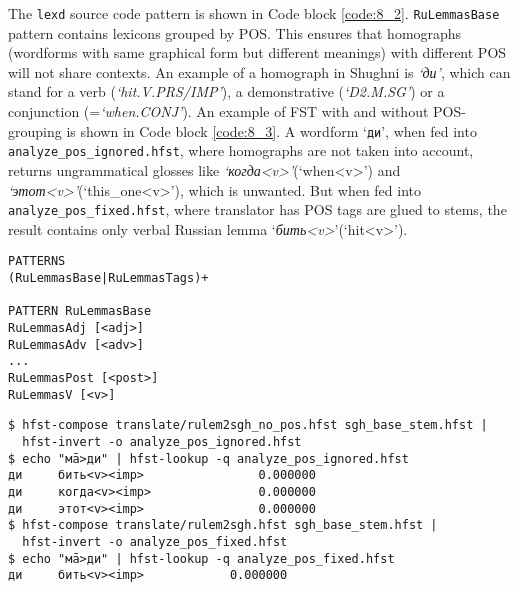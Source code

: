 The \texttt{lexd} source code pattern is shown in Code block \ref{code:8_2}. \texttt{RuLemmasBase} pattern contains lexicons grouped by POS. This ensures that homographs (wordforms with same graphical form but different meanings) with different POS will not share contexts. An example of a homograph in Shughni is \textit{`ди'}, which can stand for a verb (\textit{`hit.V.PRS/IMP'}), a demonstrative (\textit{`D2.M.SG'}) or a conjunction (=\textit{`when.CONJ'}). An example of FST with and without POS-grouping is shown in Code block \ref{code:8_3}. A wordform `\texttt{ди}', when fed into \texttt{analyze\_pos\_ignored.hfst}, where homographs are not taken into account, returns ungrammatical glosses like \textit{`когда<v>'}(`when<v>') and \textit{`этот<v>'}(`this\_one<v>'), which is unwanted. But when fed into \texttt{analyze\_pos\_fixed.hfst}, where translator has POS tags are glued to stems, the result contains only verbal Russian lemma `\textit{бить<v>}'(`hit<v>').
\begin{code_frame}[float,floatplacement=h]
    \begin{footnotesize}\codespacing
    \begin{verbatim}
PATTERNS
(RuLemmasBase|RuLemmasTags)+

PATTERN RuLemmasBase
RuLemmasAdj [<adj>]
RuLemmasAdv [<adv>]
...
RuLemmasPost [<post>]
RuLemmasV [<v>]
    \end{verbatim}
    \end{footnotesize}
    \tcblower
    \label{code:8_2}
\end{code_frame}

\begin{code_frame}[float,floatplacement=!htbp]
    \begin{footnotesize}\codespacing
    \begin{verbatim}
$ hfst-compose translate/rulem2sgh_no_pos.hfst sgh_base_stem.hfst | 
  hfst-invert -o analyze_pos_ignored.hfst
$ echo "мā>ди" | hfst-lookup -q analyze_pos_ignored.hfst
ди     бить<v><imp>                0.000000
ди     когда<v><imp>               0.000000
ди     этот<v><imp>                0.000000
$ hfst-compose translate/rulem2sgh.hfst sgh_base_stem.hfst | 
  hfst-invert -o analyze_pos_fixed.hfst
$ echo "мā>ди" | hfst-lookup -q analyze_pos_fixed.hfst
ди     бить<v><imp>            0.000000
    \end{verbatim}
    \end{footnotesize}
    \tcblower
    \label{code:8_3}
\end{code_frame}

